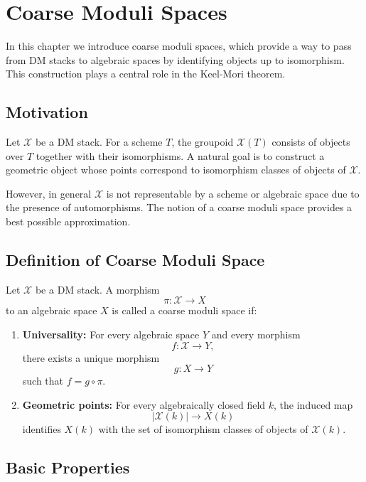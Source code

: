 \chapter{Coarse Moduli Spaces}

In this chapter we introduce coarse moduli spaces, which provide a way to pass
from DM stacks to algebraic spaces by identifying objects up to
isomorphism. This construction plays a central role in the Keel-Mori theorem.

\section{Motivation}

Let $\mathcal{X}$ be a DM stack. For a scheme $T$, the groupoid
$\mathcal{X}(T)$ consists of objects over $T$ together with their isomorphisms.
A natural goal is to construct a geometric object whose points correspond to isomorphism classes of objects of $\mathcal{X}$.

However, in general $\mathcal{X}$ is not representable by a scheme or algebraic space due to the presence of automorphisms. The notion of a coarse moduli space provides a best possible approximation.

\section{Definition of Coarse Moduli Space}

\begin{definition}
	\label{def:coarse-moduli-space}
	Let $\mathcal{X}$ be a DM stack. A morphism
	\[
	\pi : \mathcal{X} \to X
	\]
	to an algebraic space $X$ is called a coarse moduli space if:
	
	\begin{enumerate}
		\item \textbf{Universality:}  
		For every algebraic space $Y$ and every morphism
		\[
		f : \mathcal{X} \to Y,
		\]
		there exists a unique morphism
		\[
		g : X \to Y
		\]
		such that $f = g \circ \pi$.
		
		\item \textbf{Geometric points:}  
		For every algebraically closed field $k$, the induced map
		\[
		|\mathcal{X}(k)| \to X(k)
		\]
		identifies $X(k)$ with the set of isomorphism classes of objects of
		$\mathcal{X}(k)$.
	\end{enumerate}
\end{definition}


\section{Basic Properties}

